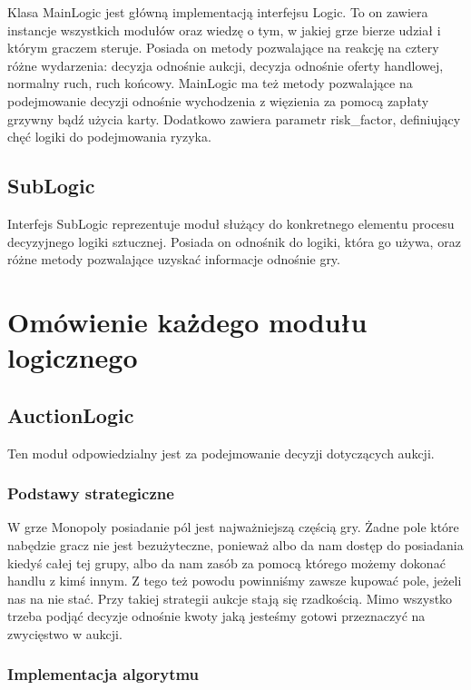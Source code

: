 \documentclass{article}
\begin{document}
Klasa MainLogic jest główną implementacją interfejsu Logic. To on zawiera instancje wszystkich modułów oraz wiedzę o tym, w jakiej grze bierze udział i którym graczem steruje. Posiada on metody pozwalające na reakcję na cztery różne wydarzenia: decyzja odnośnie aukcji, decyzja odnośnie oferty handlowej, normalny ruch, ruch końcowy. MainLogic ma też metody pozwalające na podejmowanie decyzji odnośnie wychodzenia z więzienia za pomocą zapłaty grzywny bądź użycia karty. Dodatkowo zawiera parametr risk\_factor, definiujący chęć logiki do podejmowania ryzyka.

\subsection{SubLogic}

Interfejs SubLogic reprezentuje moduł służący do konkretnego elementu procesu decyzyjnego logiki sztucznej. Posiada on odnośnik do logiki, która go używa, oraz różne metody pozwalające uzyskać informacje odnośnie gry.

\section{Omówienie każdego modułu logicznego}

\subsection{AuctionLogic}

Ten moduł odpowiedzialny jest za podejmowanie decyzji dotyczących aukcji.

\subsubsection{Podstawy strategiczne}

W grze Monopoly posiadanie pól jest najważniejszą częścią gry. Żadne pole które nabędzie gracz nie jest bezużyteczne, ponieważ albo da nam dostęp do posiadania kiedyś całej tej grupy, albo da nam zasób za pomocą którego możemy dokonać handlu z kimś innym. Z tego też powodu powinniśmy zawsze kupować pole, jeżeli nas na nie stać. Przy takiej strategii aukcje stają się rzadkością. Mimo wszystko trzeba podjąć decyzje odnośnie kwoty jaką jesteśmy gotowi przeznaczyć na zwycięstwo w aukcji.

\subsubsection{Implementacja algorytmu}
\end{document}
